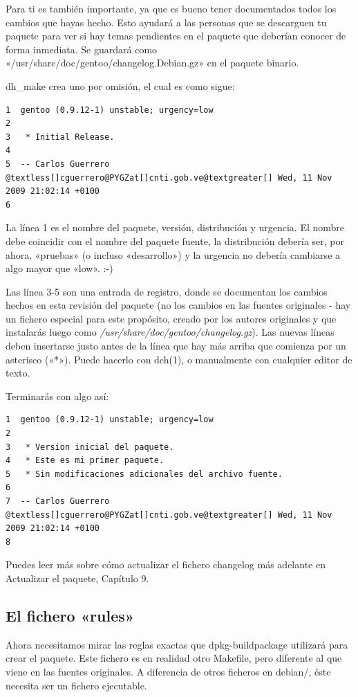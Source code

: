 \documentclass[letterpaper,12pt,spanish]{manual}
\begin{document}
Para ti es también importante, ya que es bueno tener documentados todos los cambios que hayas hecho. Esto ayudará a las personas que se descarguen tu paquete para ver si hay temas pendientes en el paquete que deberían conocer de forma inmediata. Se guardará como «/usr/share/doc/gentoo/changelog.Debian.gz» en el paquete binario.

dh\_make crea uno por omisión, el cual es como sigue:

\begin{Verbatim}[commandchars=@\[\]]
1  gentoo (0.9.12-1) unstable; urgency=low
2
3   * Initial Release.
4
5  -- Carlos Guerrero @textless[]cguerrero@PYGZat[]cnti.gob.ve@textgreater[] Wed, 11 Nov 2009 21:02:14 +0100
6
\end{Verbatim}

La línea 1 es el nombre del paquete, versión, distribución y urgencia. El nombre debe coincidir con el nombre del paquete fuente, la distribución debería ser, por ahora, «pruebas» (o incluso «desarrollo») y la urgencia no debería cambiarse a algo mayor que «low». :-)

Las línea 3-5 son una entrada de registro, donde se documentan los cambios hechos en esta revisión del paquete (no los cambios en las fuentes originales - hay un fichero especial para este propósito, creado por los autores originales y que instalarás luego como \emph{/usr/share/doc/gentoo/changelog.gz}). Las nuevas líneas deben insertarse justo antes de la línea que hay más arriba que comienza por un asterisco («*»). Puede hacerlo con dch(1), o manualmente con cualquier editor de texto.

Terminarás con algo así:

\begin{Verbatim}[commandchars=@\[\]]
1  gentoo (0.9.12-1) unstable; urgency=low
2
3   * Version inicial del paquete.
4   * Este es mi primer paquete.
5   * Sin modificaciones adicionales del archivo fuente.
6
7  -- Carlos Guerrero @textless[]cguerrero@PYGZat[]cnti.gob.ve@textgreater[] Wed, 11 Nov 2009 21:02:14 +0100
8
\end{Verbatim}

Puedes leer más sobre cómo actualizar el fichero changelog más adelante en Actualizar el paquete, Capítulo 9.


\subsection{El fichero «rules»}

Ahora necesitamos mirar las reglas exactas que dpkg-buildpackage utilizará para crear el paquete. Este fichero es en realidad otro Makefile, pero diferente al que viene en las fuentes originales. A diferencia de otros ficheros en debian/, éste necesita ser un fichero ejecutable.
\end{document}
